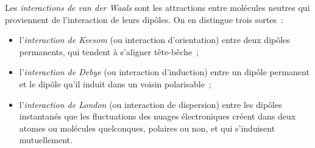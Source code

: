 \begin{definition}\label{def:b1:intermolecular-forces-solvents:vdw}
Les \emph{interactions de van der Waals}
sont les attractions entre molécules neutres qui proviennent de
l'interaction de leurs dipôles. On en distingue trois sortes~:
\begin{itemize}
  \item l'\emph{interaction de Keesom} (ou
        interaction d'orientation) entre deux dipôles permanents, qui
        tendent à s'aligner tête-bêche~;
  \item l'\emph{interaction de Debye} (ou
        interaction d'induction) entre un dipôle permanent et le dipôle
        qu'il induit dans un voisin polarisable~;
  \item l'\emph{interaction de London} (ou
        interaction de dispersion) entre les dipôles instantanés que les
        fluctuations des nuages électroniques créent dans deux atomes ou
        molécules quelconques, polaires ou non, et qui s'induisent
        mutuellement.
\end{itemize}
\end{definition}

